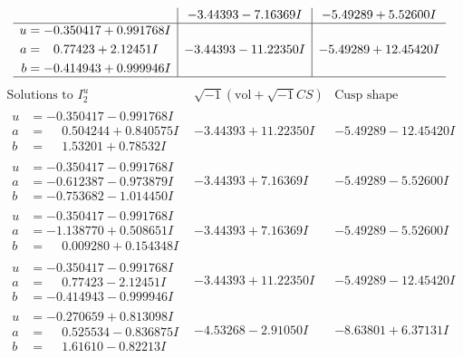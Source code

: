 \documentclass[1p]{elsarticle_modified}
\theoremstyle{definition}
\newcommand{\I}{\sqrt{-1}}
\begin{document}
$$\begin{array}{c|c|c}
 & -3.44393 - 7.16369 I & -5.49289 + 5.52600 I \\ \hline\begin{aligned}
u &= -0.350417 + 0.991768 I \\
a &= \phantom{-}0.77423 + 2.12451 I \\
b &= -0.414943 + 0.999946 I\end{aligned}
 & -3.44393 - 11.22350 I & -5.49289 + 12.45420 I\\
 \hline 
 \end{array}$$\newpage$$\begin{array}{c|c|c}  
\text{Solutions to }I^u_{2}& \I (\text{vol} + \sqrt{-1}CS) & \text{Cusp shape}\\
 \hline 
\begin{aligned}
u &= -0.350417 - 0.991768 I \\
a &= \phantom{-}0.504244 + 0.840575 I \\
b &= \phantom{-}1.53201 + 0.78532 I\end{aligned}
 & -3.44393 + 11.22350 I & -5.49289 - 12.45420 I \\ \hline\begin{aligned}
u &= -0.350417 - 0.991768 I \\
a &= -0.612387 - 0.973879 I \\
b &= -0.753682 - 1.014450 I\end{aligned}
 & -3.44393 + 7.16369 I & -5.49289 - 5.52600 I \\ \hline\begin{aligned}
u &= -0.350417 - 0.991768 I \\
a &= -1.138770 + 0.508651 I \\
b &= \phantom{-}0.009280 + 0.154348 I\end{aligned}
 & -3.44393 + 7.16369 I & -5.49289 - 5.52600 I \\ \hline\begin{aligned}
u &= -0.350417 - 0.991768 I \\
a &= \phantom{-}0.77423 - 2.12451 I \\
b &= -0.414943 - 0.999946 I\end{aligned}
 & -3.44393 + 11.22350 I & -5.49289 - 12.45420 I \\ \hline\begin{aligned}
u &= -0.270659 + 0.813098 I \\
a &= \phantom{-}0.525534 - 0.836875 I \\
b &= \phantom{-}1.61610 - 0.82213 I\end{aligned}
 & -4.53268 - 2.91050 I & -8.63801 + 6.37131 I \\ \hline\begin{aligned}

\end{aligned}
\end{array}$$
\end{document}
